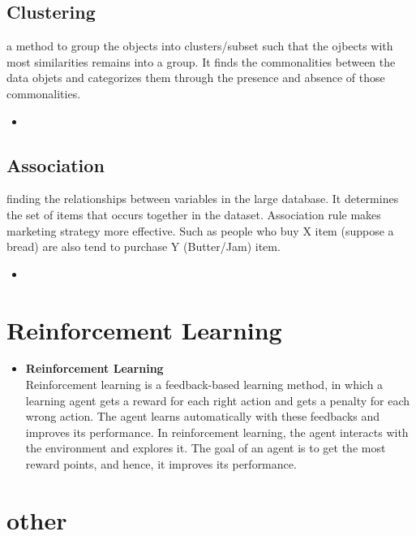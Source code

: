 \documentclass{article}
\begin{document}
\subsection*{Clustering}
a method to group the objects into clusters/subset such that the ojbects with most similarities remains into a group. It finds the commonalities between the data objets and categorizes them through the presence and absence of those commonalities.
\begin{itemize}
\item
\end{itemize}

\subsection*{Association}
 finding the relationships between variables in the large database. It determines the set of items that occurs together in the dataset. Association rule makes marketing strategy more effective. Such as people who buy X item (suppose a bread) are also tend to purchase Y (Butter/Jam) item.
\begin{itemize}
\item
\end{itemize}

\section{Reinforcement Learning}
\begin{itemize}
\item \textbf{Reinforcement Learning}\\
Reinforcement learning is a feedback-based learning method, in which a learning agent gets a reward for each right action and gets a penalty for each wrong action. The agent learns automatically with these feedbacks and improves its performance. In reinforcement learning, the agent interacts with the environment and explores it. The goal of an agent is to get the most reward points, and hence, it improves its performance.
\end{itemize}

\section{other}
\end{document}

